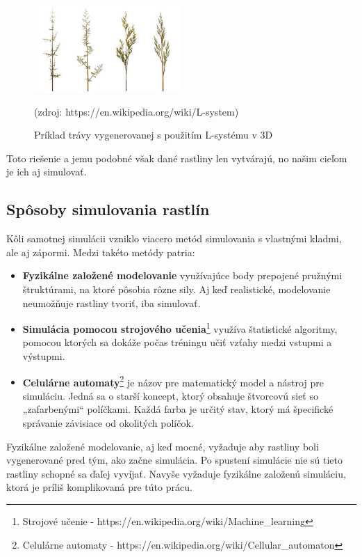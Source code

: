 \documentclass[12pt]{article}
\begin{document}
\begin{figure}[ht]
	\centering
	\includegraphics[width=0.5\textwidth]{res/Fractal_weeds.png}
	\caption{Príklad trávy vygenerovanej s použitím L-systému v 3D}

	\footnotesize (zdroj: https://en.wikipedia.org/wiki/L-system)

	\label{obr:priklad l-systemu}
\end{figure}

Toto riešenie a jemu podobné však dané rastliny len vytvárajú, no našim cieľom
je ich aj simulovať.


\subsection{Spôsoby simulovania rastlín}

Kôli samotnej simulácii vzniklo viacero metód simulovania s vlastnými kladmi,
ale aj zápormi. Medzi takéto metódy patria:

\begin{itemize}
	\item \textbf{Fyzikálne založené modelovanie} využívajúce body prepojené
		pružnými štruktúrami, na ktoré pôsobia rôzne sily. Aj keď realistické,
		modelovanie neumožňuje rastliny tvoriť, iba simulovať.
	\item \textbf{Simulácia pomocou strojového učenia}\footnote
			{Strojové učenie - https://en.wikipedia.org/wiki/Machine\_learning}
		využíva štatistické
		algoritmy, pomocou ktorých sa dokáže počas tréningu učiť vzťahy medzi
		vstupmi a výstupmi.
	\item \textbf{Celulárne automaty}\footnote
			{Celulárne automaty - https://en.wikipedia.org/wiki/Cellular\_automaton}
		je názov pre matematický model a nástroj pre simuláciu. Jedná sa
		o starší koncept, ktorý obsahuje štvorcovú sieť so „zafarbenými“
		políčkami. Každá farba je určitý stav, ktorý má špecifické správanie
		závisiace od okolitých políčok.
\end{itemize}

Fyzikálne založené modelovanie, aj keď mocné, vyžaduje aby rastliny boli
vygenerované pred tým, ako začne simulácia. Po spustení simulácie nie sú tieto
rastliny schopné sa ďaľej vyvíjať. Navyše vyžaduje fyzikálne založenú
simuláciu, ktorá je príliš komplikovaná pre túto prácu.
\end{document}

